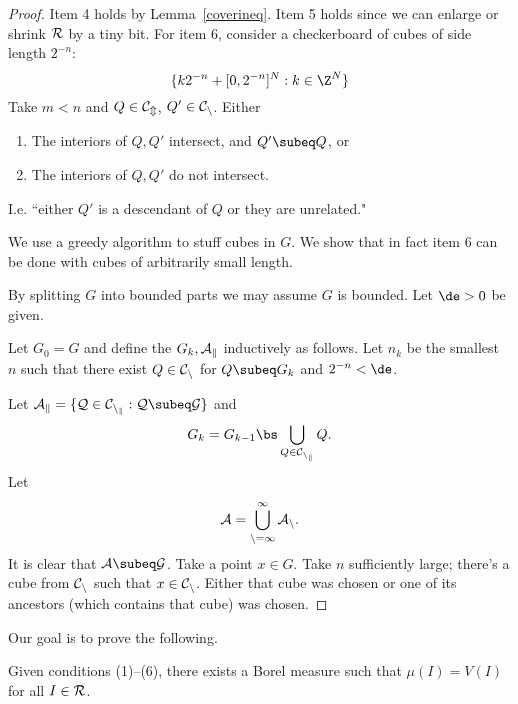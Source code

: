 \begin{proof}
Item 4 holds by Lemma~\ref{coverineq}. Item 5 holds since we can enlarge or shrink $\cal R$ by a tiny bit. For item 6, consider a checkerboard of cubes of side length $2^{-n}$:
\[
\{k2^{-n}+[0,2^{-n}]^N:k\in \Z^N\}
\]
Take $m<n$ and $Q\in \cal C_m$, $Q'\in \cal C_n$. Either
\begin{enumerate}
\item The interiors of $Q,Q'$ intersect, and $Q'\subeq Q$, or
\item
The interiors of $Q,Q'$ do not intersect.
\end{enumerate}
I.e. ``either $Q'$ is a descendant of $Q$ or they are unrelated."

We use a greedy algorithm to stuff cubes in $G$. We show that in fact item 6 can be done with cubes of arbitrarily small length.

By splitting $G$ into bounded parts we may assume $G$ is bounded. Let $\de>0$ be given.

Let $G_0=G$ and define the $G_k,\cal A_k$ inductively as follows.
Let $n_k$ be the smallest $n$ such that there exist $Q\in \cal C_n$ for $Q\subeq G_k$ and $2^{-n}<\de$. 

Let $\cal A_k=\{Q\in \cal C_{n_k}:Q\subeq G\}$ and 
\[G_k=G_{k-1}\bs \bigcup_{Q\in \cal C_{n_k}}Q.\]
Let
\[\cal A=\bigcup_{n=1}^{\infty}\cal A_n.\]
It is clear that $\cal A\subeq G$. Take a point $x\in G$. Take $n$ sufficiently large; there's a cube from $\cal C_n$ such that $x\in \cal C_n$. %
Either that cube was chosen or one of its ancestors (which contains that cube) was chosen.%
\end{proof}
Our goal is to prove the following.
\begin{thm}\label{measprogram}
Given conditions (1)--(6), there exists a Borel measure such that $\mu(I)=V(I)$ for all $I\in \cal R$.
\end{thm}
